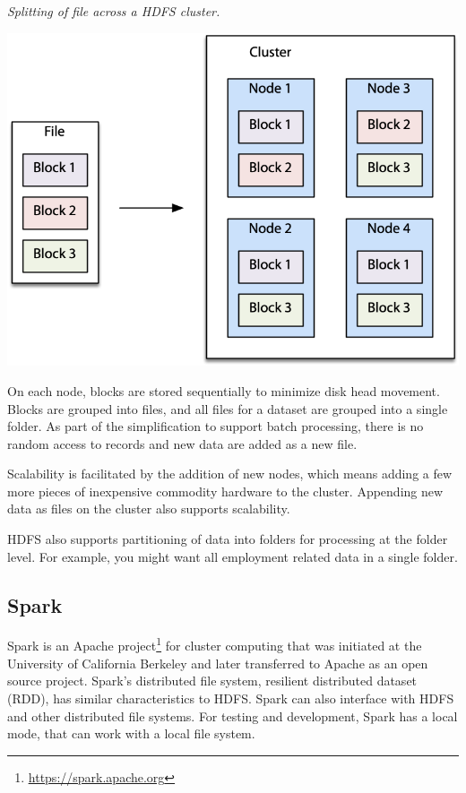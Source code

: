 \documentclass[
]{article}
\begin{document}
\emph{Splitting of file across a HDFS cluster.}

\includegraphics{Figures/Chapter 18/splitting-cluster.png}

On each node, blocks are stored sequentially to minimize disk head
movement. Blocks are grouped into files, and all files for a dataset are
grouped into a single folder. As part of the simplification to support
batch processing, there is no random access to records and new data are
added as a new file.

Scalability is facilitated by the addition of new nodes, which means
adding a few more pieces of inexpensive commodity hardware to the
cluster. Appending new data as files on the cluster also supports
scalability.

HDFS also supports partitioning of data into folders for processing at
the folder level. For example, you might want all employment related
data in a single folder.

\hypertarget{spark}{%
\subsection*{Spark}\label{spark}}

Spark is an Apache project\footnote{\href{https://spark.apache.org}{\underline{https://spark.apache.org}}} for cluster computing
that was initiated at the University of California Berkeley and later
transferred to Apache as an open source project. Spark's distributed
file system, resilient distributed dataset (RDD), has similar
characteristics to HDFS. Spark can also interface with HDFS and other
distributed file systems. For testing and development, Spark has a local
mode, that can work with a local file system.
\end{document}
